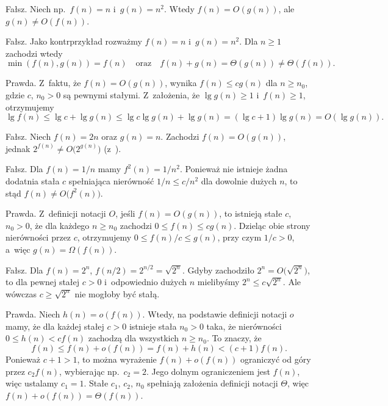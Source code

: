 
\subproblem %
Fałsz.
Niech np.\ $f(n)=n$ i~$g(n)=n^2$.
Wtedy $f(n)=O(g(n))$, ale $g(n)\ne O(f(n))$.

\subproblem %
Fałsz.
Jako kontrprzykład rozważmy $f(n)=n$ i~$g(n)=n^2$.
Dla $n\ge1$ zachodzi wtedy
\[
	\min(f(n),g(n)) = f(n) \quad\text{oraz}\quad f(n)+g(n) = \Theta(g(n)) \ne \Theta(f(n)).
\]

\subproblem %
Prawda.
Z~faktu, że $f(n)=O(g(n))$, wynika $f(n)\le cg(n)$ dla $n\ge n_0$, gdzie $c$, $n_0>0$ są pewnymi stałymi.
Z~założenia, że $\lg g(n)\ge1$ i~$f(n)\ge1$, otrzymujemy
\[
	\lg f(n) \le \lg c+\lg g(n) \le \lg c\lg g(n)+\lg g(n) = (\lg c+1)\lg g(n) = O(\lg g(n)).
\]

\subproblem %
Fałsz.
Niech $f(n)=2n$ oraz $g(n)=n$.
Zachodzi $f(n)=O(g(n))$, jednak $2^{f(n)}\ne O\bigl(2^{g(n)}\bigr)$ (z~).

\subproblem %
Fałsz.
Dla $f(n)=1/n$ mamy $f^2(n)=1/n^2$.
Ponieważ nie istnieje żadna dodatnia stała $c$ spełniająca nierówność $1/n\le c/n^2$ dla dowolnie dużych $n$, to stąd $f(n)\ne O\bigl(f^2(n)\bigr)$.

\subproblem %
Prawda.
Z~definicji notacji $O$, jeśli $f(n)=O(g(n))$, to istnieją stałe $c$, $n_0>0$, że dla każdego $n\ge n_0$ zachodzi $0\le f(n)\le cg(n)$.
Dzieląc obie strony nierówności przez $c$, otrzymujemy $0\le f(n)/c\le g(n)$, przy czym $1/c>0$, a~więc $g(n)=\Omega(f(n))$.

\subproblem %
Fałsz.
Dla $f(n)=2^n$, $f(n/2)=2^{n/2}=\sqrt{2^n}$.
Gdyby zachodziło $2^n=O\bigl(\!\sqrt{2^n}\bigr)$, to dla pewnej stałej $c>0$ i~odpowiednio dużych $n$ mielibyśmy $2^n\le c\sqrt{2^n}$.
Ale wówczas $c\ge\sqrt{2^n}$ nie mogłoby być stałą.

\subproblem %
Prawda.
Niech $h(n)=o(f(n))$.
Wtedy, na podstawie definicji notacji $o$ mamy, że dla każdej stałej $c>0$ istnieje stała $n_0>0$ taka, że nierówności $0\le h(n)<cf(n)$ zachodzą dla wszystkich $n\ge n_0$.
To znaczy, że
\[
	f(n) \le f(n)+o(f(n)) = f(n)+h(n) < (c+1)f(n).
\]
Ponieważ $c+1>1$, to można wyrażenie $f(n)+o(f(n))$ ograniczyć od góry przez $c_2f(n)$, wybierając np.\ $c_2=2$.
Jego dolnym ograniczeniem jest $f(n)$, więc ustalamy $c_1=1$.
Stałe $c_1$, $c_2$, $n_0$ spełniają założenia definicji notacji $\Theta$, więc $f(n)+o(f(n))=\Theta(f(n))$.
